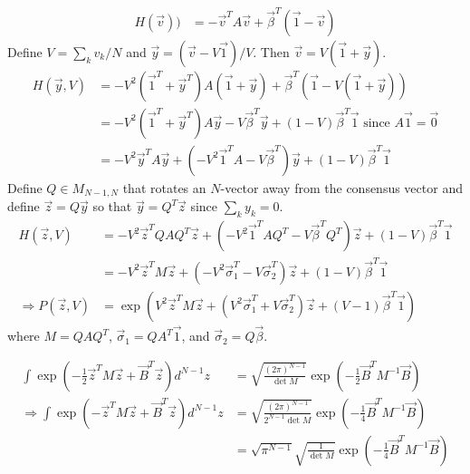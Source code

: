 \documentclass{article}
\begin{document}
\begin{align*}
H(\vec{v}))&=-\vec{v}^TA\vec{v}+\vec{\beta}^T(\vec{1}-\vec{v})
\end{align*}
Define $V=\sum_kv_k/N$ and $\vec{y}=(\vec{v}-V\vec{1})/V$.  Then $\vec{v}=V(\vec{1}+\vec{y})$.  
\begin{align*}
H(\vec{y},V)&=-V^2(\vec{1}^T+\vec{y}^T)A(\vec{1}+\vec{y})+\vec{\beta}^T(\vec{1}-V(\vec{1}+\vec{y}))
\\&=-V^2(\vec{1}^T+\vec{y}^T)A\vec{y}-V\vec{\beta}^T\vec{y}+(1-V)\vec{\beta}^T\vec{1} \text{ since $A\vec{1}=\vec{0}$}
\\&=-V^2\vec{y}^TA\vec{y}+(-V^2\vec{1}^TA-V\vec{\beta}^T)\vec{y}+(1-V)\vec{\beta}^T\vec{1}
\end{align*}
Define $Q\in M_{N-1,N}$ that rotates an $N$-vector away from the consensus vector and define $\vec{z}=Q\vec{y}$ so that $\vec{y}=Q^T\vec{z}$ since $\sum_ky_k=0$.
\begin{align*}
H(\vec{z},V)&=-V^2\vec{z}^TQAQ^T\vec{z}+(-V^2\vec{1}^TAQ^T-V\vec{\beta}^TQ^T)\vec{z}+(1-V)\vec{\beta}^T\vec{1}
\\&=-V^2\vec{z}^TM\vec{z}+(-V^2\vec{\sigma}_1^T-V\vec{\sigma}_2^T)\vec{z}+(1-V)\vec{\beta}^T\vec{1}
\\ \Rightarrow P(\vec{z},V)&=\exp\left(V^2\vec{z}^TM\vec{z}+(V^2\vec{\sigma}_1^T+V\vec{\sigma}_2^T)\vec{z}+(V-1)\vec{\beta}^T\vec{1}\right)
\end{align*}
where $M=QAQ^T$, $\vec{\sigma}_1=QA^T\vec{1}$, and $\vec{\sigma}_2=Q\vec{\beta}$.


\begin{fact}
\begin{align*}
\int\exp\left(-\frac{1}{2}\vec{z}^TM\vec{z}+\vec{B}^T\vec{z}\right)d^{N-1}z&=\sqrt{\frac{(2\pi)^{N-1}}{\det M}}\exp\left(-\frac{1}{2}\vec{B}^TM^{-1}\vec{B}\right)
\\\Rightarrow \int\exp\left(-\vec{z}^TM\vec{z}+\vec{B}^T\vec{z}\right)d^{N-1}z&=\sqrt{\frac{(2\pi)^{N-1}}{2^{N-1}\det M}}\exp\left(-\frac{1}{4}\vec{B}^TM^{-1}\vec{B}\right)
\\&=\sqrt{\pi^{N-1}}\sqrt{\frac{1}{\det M}}\exp\left(-\frac{1}{4}\vec{B}^TM^{-1}\vec{B}\right)
\end{align*}
\end{fact}
\end{document}
